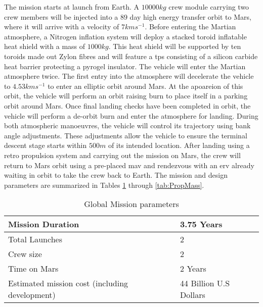 The mission starts at launch from Earth. A $10 000 kg$ crew module carrying two crew members will be injected into a $89$ day high energy transfer orbit to Mars, where it will arrive with a velocity of $7 kms^{-1}$. Before entering the Martian atmosphere, a Nitrogen inflation system will deploy a stacked toroid inflatable heat shield with a mass of $1000 kg$. This heat shield will be supported by ten toroids made out Zylon fibres and will feature a \gls{tps} consisting of a silicon carbide heat barrier protecting a pyrogel insulator. The vehicle will enter the Martian atmosphere twice. The first entry into the atmosphere will decelerate the vehicle to $4.53 kms^{-1}$ to enter an elliptic orbit around Mars. At the apoareion of this orbit, the vehicle will perform an orbit raising burn to place itself in a parking orbit around Mars. Once final landing checks have been completed in orbit, the vehicle will perform a de-orbit burn and enter the atmosphere for landing. During both atmospheric manoeuvres, the vehicle will control its trajectory using bank angle adjustments. These adjustments allow the vehicle to ensure the terminal descent stage starts within $500m$ of its intended location. After landing using a retro propulsion system and carrying out the mission on Mars, the crew will return to Mars orbit using a pre-placed \gls{mav} and rendezvous with an \gls{erv} already waiting in orbit to take the crew back to Earth. The mission and design parameters are summarized in Tables \ref{tab:MissionPar} through \ref{tab:PropMass}.


\begin{table}
	\centering
	\caption{Global Mission parameters}
	\label{tab:MissionPar}
	\begin{tabular}{|l|l|} \hline
		Mission Duration				             	& 	3.75 Years						\\ \hline 
		Total Launches       							&	2  		   	  					\\ \hline
		Crew size				 						&	2     	  						\\ \hline
		Time on Mars				              	   	&  	2 Years    						\\ \hline
		Estimated mission cost (including development) 	&  	44 Billion U.S Dollars			\\ \hline
	\end{tabular}
\end{table}

